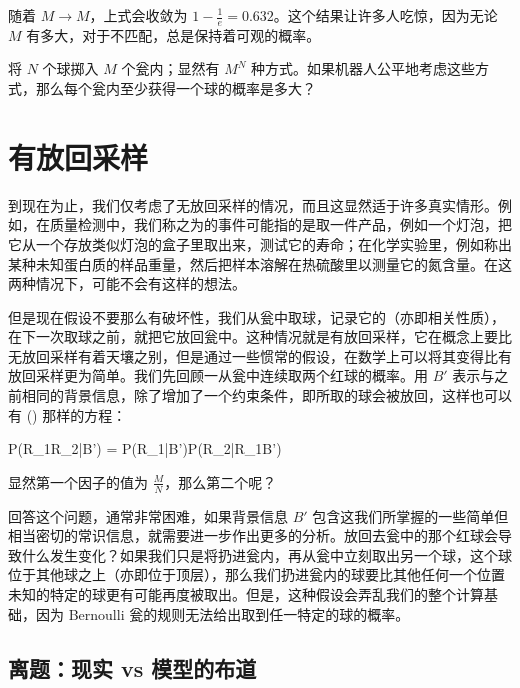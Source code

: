 随着 $M \rightarrow M$，上式会收敛为 $1 - \frac{1}{e} = 0.632$。这个结果让许多人吃惊，因为无论 $M$ 有多大，对于不匹配，总是保持着可观的概率。
\stopExercise

\startExercise
将 $N$ 个球掷入 $M$ 个瓮内；显然有 $M^N$ 种方式。如果机器人公平地考虑这些方式，那么每个瓮内至少获得一个球的概率是多大？
\stopExercise

\section{有放回采样}

到现在为止，我们仅考虑了无放回采样的情况，而且这显然适于许多真实情形。例如，在质量检测中，我们称之为的事件可能指的是取一件产品，例如一个灯泡，把它从一个存放类似灯泡的盒子里取出来，测试它的寿命；在化学实验里，例如称出某种未知蛋白质的样品重量，然后把样本溶解在热硫酸里以测量它的氮含量。在这两种情况下，可能不会有这样的想法。

但是现在假设不要那么有破坏性，我们从瓮中取球，记录它的（亦即相关性质），在下一次取球之前，就把它放回瓮中。这种情况就是有放回采样，它在概念上要比无放回采样有着天壤之别，但是通过一些惯常的假设，在数学上可以将其变得比有放回采样更为简单。我们先回顾一从瓮中连续取两个红球的概率。用 $B'$ 表示与之前相同的背景信息，除了增加了一个约束条件，即所取的球会被放回，这样也可以有 (\in[3-9]) 那样的方程：

\placeformula[3-91]
\startformula
P(R_1R_2|B') = P(R_1|B')P(R_2|R_1B')
\stopformula

显然第一个因子的值为 $\frac{M}{N}$，那么第二个呢？

回答这个问题，通常非常困难，如果背景信息 $B'$ 包含这我们所掌握的一些简单但相当密切的常识信息，就需要进一步作出更多的分析。放回去瓮中的那个红球会导致什么发生变化？如果我们只是将扔进瓮内，再从瓮中立刻取出另一个球，这个球位于其他球之上（亦即位于顶层），那么我们扔进瓮内的球要比其他任何一个位置未知的特定的球更有可能再度被取出。但是，这种假设会弄乱我们的整个计算基础，因为 Bernoulli 瓮的规则无法给出取到任一特定的球的概率。

\subsection{离题：现实 vs  模型的布道}